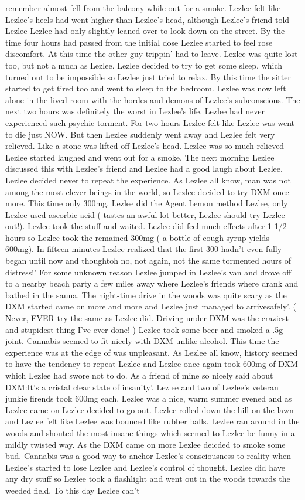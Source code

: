 \documentclass[12pt]{book}
\begin{document}
remember almost fell from the balcony while out for a smoke. Lezlee felt like Lezlee's heels had went higher than Lezlee's head, although Lezlee's friend told Lezlee Lezlee had only slightly leaned over to look down on the street. By the time four hours had passed from the initial dose Lezlee started to feel rose discomfort. At this time the other guy trippin' had to leave. Lezlee was quite lost too, but not a much as Lezlee. Lezlee decided to try to get some sleep, which turned out to be impossible so Lezlee just tried to relax. By this time the sitter started to get tired too and went to sleep to the bedroom. Lezlee was now left alone in the lived room with the hordes and demons of Lezlee's subconscious. The next two hours was definitely the worst in Lezlee's life. Lezlee had never experienced such psychic torment. For two hours Lezlee felt like Lezlee was went to die just NOW. But then Lezlee suddenly went away and Lezlee felt very relieved. Like a stone was lifted off Lezlee's head. Lezlee was so much relieved Lezlee started laughed and went out for a smoke. The next morning Lezlee discussed this with Lezlee's friend and Lezlee had a good laugh about Lezlee. Lezlee decided never to repeat the experience. As Lezlee all know, man was not among the most clever beings in the world, so Lezlee decided to try DXM once more. This time only 300mg. Lezlee did the Agent Lemon method Lezlee, only Lezlee used ascorbic acid ( tastes an awful lot better, Lezlee should try Lezlee out!). Lezlee took the stuff and waited. Lezlee did feel much effects after 1 1/2 hours so Lezlee took the remained 300mg ( a bottle of cough syrup yields 600mg). In fifteen minutes Lezlee realized that the first 300 hadn't even fully began until now and thoughtoh no, not again, not the same tormented hours of distress!' For some unknown reason Lezlee jumped in Lezlee's van and drove off to a nearby beach party a few miles away where Lezlee's friends where drank and bathed in the sauna. The night-time drive in the woods was quite scary as the DXM started came on more and more and Lezlee just managed to arrivesafely'. ( Never, EVER try the same as Lezlee did. Driving under DXM was the craziest and stupidest thing I've ever done! ) Lezlee took some beer and smoked a .5g joint. Cannabis seemed to fit nicely with DXM unlike alcohol. This time the experience was at the edge of was unpleasant. As Lezlee all know, history seemed to have the tendency to repeat Lezlee and Lezlee once again took 600mg of DXM which Lezlee had swore not to do. As a friend of mine so nicely said about DXM:It's a cristal clear state of insanity'. Lezlee and two of Lezlee's veteran junkie firends took 600mg each. Lezlee was a nice, warm summer evened and as Lezlee came on Lezlee decided to go out. Lezlee rolled down the hill on the lawn and Lezlee felt like Lezlee was bounced like rubber balls. Lezlee ran around in the woods and shouted the most insane things which seemed to Lezlee be funny in a mildly twisted way. As the DXM came on more Lezlee deicded to smoke some bud. Cannabis was a good way to anchor Lezlee's consciousness to reality when Lezlee's started to lose Lezlee and Lezlee's control of thought. Lezlee did have any dry stuff so Lezlee took a flashlight and went out in the woods towards the weeded field. To this day Lezlee can't 
\end{document}

